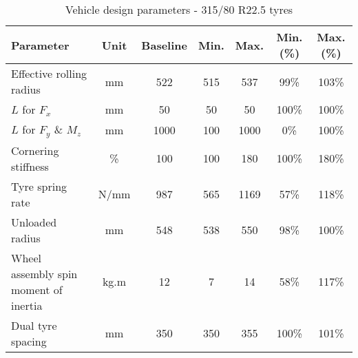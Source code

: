 \begin{table}[H]
	\centering\footnotesize
	\begin{threeparttable}

		\begin{tabulary}{\textwidth}{lcccccc}
			\toprule
			\textbf{Parameter} & \textbf{Unit} & \textbf{Baseline} & \textbf{Min.} & \textbf{Max.} & \textbf{Min. (\%)} & \textbf{Max. (\%)} \\

			\midrule
			Effective rolling radius & mm    & 522   & 515   & 537   & 99\%  & 103\% \\
			$L$ for $F_x$ & mm     & 50    & 50    & 50    & 100\% & 100\% \\
			$L$ for $F_y$ \& $M_z$ & mm     & 1000  & 100     & 1000  & 0\%   & 100\% \\
			Cornering stiffness & \%    & 100   & 100   & 180   & 100\% & 180\% \\
			Tyre spring rate & N/mm  & 987   & 565   & 1169  & 57\%  & 118\% \\
			Unloaded radius & mm    & 548   & 538   & 550   & 98\%  & 100\% \\
			Wheel assembly spin moment of inertia & kg.m\sstw{} & 12    & 7     & 14    & 58\%  & 117\% \\
			Dual tyre spacing & mm    & 350   & 350   & 355   & 100\% & 101\% \\

			\bottomrule
		\end{tabulary}

		\caption{Vehicle design parameters - 315/80 R22.5 tyres}
		\label{table:vdp-tyre-315}


	\end{threeparttable}
\end{table}

